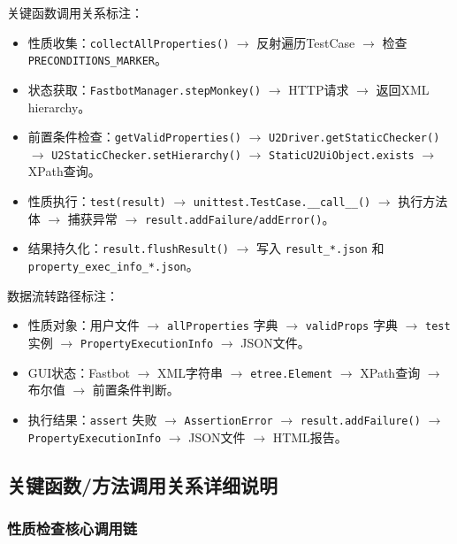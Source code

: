 \documentclass[a4paper, zihao=-4]{ctexart}
\newcommand{\bff}[1]{{\heiti #1}}
\begin{document}
\bff{关键函数调用关系标注}：
\begin{itemize}
    \item \bff{性质收集}：\texttt{collectAllProperties()} $\rightarrow$ 反射遍历TestCase $\rightarrow$ 检查 \texttt{PRECONDITIONS\_MARKER}。
    \item \bff{状态获取}：\texttt{FastbotManager.stepMonkey()} $\rightarrow$ HTTP请求 $\rightarrow$ 返回XML hierarchy。
    \item \bff{前置条件检查}：\texttt{getValidProperties()} $\rightarrow$ \texttt{U2Driver.getStaticChecker()} $\rightarrow$ \texttt{U2StaticChecker.setHierarchy()} $\rightarrow$ \texttt{StaticU2UiObject.exists} $\rightarrow$ XPath查询。
    \item \bff{性质执行}：\texttt{test(result)} $\rightarrow$ \texttt{unittest.TestCase.\_\_call\_\_()} $\rightarrow$ 执行方法体 $\rightarrow$ 捕获异常 $\rightarrow$ \texttt{result.addFailure/addError()}。
    \item \bff{结果持久化}：\texttt{result.flushResult()} $\rightarrow$ 写入 \texttt{result\_*.json} 和 \texttt{property\_exec\_info\_*.json}。
\end{itemize}

\bff{数据流转路径标注}：
\begin{itemize}
    \item \bff{性质对象}：用户文件 $\rightarrow$ \texttt{allProperties} 字典 $\rightarrow$ \texttt{validProps} 字典 $\rightarrow$ \texttt{test} 实例 $\rightarrow$ \texttt{PropertyExecutionInfo} $\rightarrow$ JSON文件。
    \item \bff{GUI状态}：Fastbot $\rightarrow$ XML字符串 $\rightarrow$ \texttt{etree.Element} $\rightarrow$ XPath查询 $\rightarrow$ 布尔值 $\rightarrow$ 前置条件判断。
    \item \bff{执行结果}：\texttt{assert} 失败 $\rightarrow$ \texttt{AssertionError} $\rightarrow$ \texttt{result.addFailure()} $\rightarrow$ \texttt{PropertyExecutionInfo} $\rightarrow$ JSON文件 $\rightarrow$ HTML报告。
\end{itemize}

\subsection{关键函数/方法调用关系详细说明}

\subsubsection{性质检查核心调用链}
\end{document}
